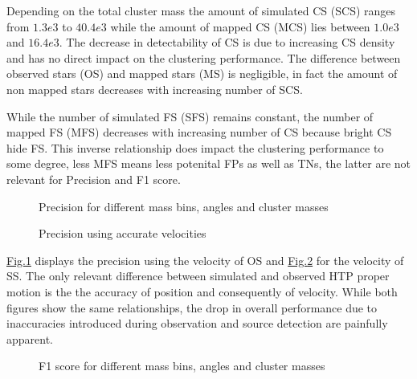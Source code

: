 \documentclass[letterpaper,10pt,english]{sphinxmanual}
\begin{document}
\sphinxAtStartPar
Depending on the total cluster mass the amount of simulated CS (SCS) ranges from \(1.3e3\) to \(40.4e3\) while the amount of mapped CS (MCS) lies between \(1.0e3\) and \(16.4e3\).
The decrease in detectability of CS is due to increasing CS density and has no direct impact on the clustering performance.
The difference between observed stars (OS) and mapped stars (MS) is negligible, in fact the amount of non mapped stars decreases with increasing number of SCS.

\sphinxAtStartPar
While the number of simulated FS (SFS) remains constant, the number of mapped FS (MFS) decreases with increasing number of CS because bright CS hide FS.
This inverse relationship does impact the clustering performance to some degree, less MFS means less potenital FPs as well as TNs, the latter are not relevant for Precision and F1 score.

\begin{figure}[htbp]
\centering
\capstart

\noindent{}
\caption{Precision for different mass bins, angles and cluster masses}\label{\detokenize{NBodySimulation/Experiments:id4}}\label{\detokenize{NBodySimulation/Experiments:fig-25-precision}}\end{figure}

\begin{figure}[htbp]
\centering
\capstart

\noindent{}
\caption{Precision using accurate velocities}\label{\detokenize{NBodySimulation/Experiments:id5}}\label{\detokenize{NBodySimulation/Experiments:fig-25-precision-sim}}\end{figure}

\sphinxAtStartPar
\hyperref[\detokenize{NBodySimulation/Experiments:fig-25-precision}]{Fig.\@ \ref{\detokenize{NBodySimulation/Experiments:fig-25-precision}}} displays the precision using the velocity of OS and \hyperref[\detokenize{NBodySimulation/Experiments:fig-25-precision-sim}]{Fig.\@ \ref{\detokenize{NBodySimulation/Experiments:fig-25-precision-sim}}} for the velocity of SS.
The only relevant difference between simulated and observed HTP proper motion is the the accuracy of position and consequently of velocity.
While both figures show the same relationships, the drop in overall performance due to inaccuracies introduced during observation and source detection are painfully apparent.

\begin{figure}[htbp]
\centering
\capstart

\noindent{}
\caption{F1 score for different mass bins, angles and cluster masses}\label{\detokenize{NBodySimulation/Experiments:id6}}\label{\detokenize{NBodySimulation/Experiments:fig-25-f1}}\end{figure}
\end{document}
